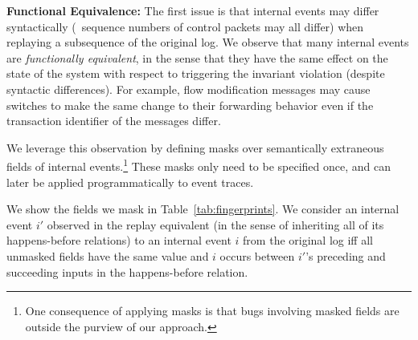 

{\bf Functional Equivalence: }The first issue is that internal events may differ syntactically (\eg~sequence numbers
of control packets may all differ) when replaying a subsequence of the original log.
We observe that many internal events are {\em functionally
equivalent}, in the sense that they
have the same effect on the state of the system with respect to triggering the
invariant violation (despite syntactic differences). For example, flow
modification messages may cause switches to make the same change to their forwarding behavior
even if the transaction identifier of the messages differ.

We leverage this observation by defining
masks over semantically extraneous fields of
internal events.\footnote{One consequence
of applying masks is that bugs involving masked fields are outside the purview of
our approach.} These masks only need to be specified once, and can later be
applied programmatically to event traces.

We show the fields we mask in Table~\ref{tab:fingerprints}. We consider an
internal event $i'$ observed in the replay
equivalent (in the sense of inheriting all of its happens-before relations) to an internal event $i$ from the original log iff all unmasked
fields have the same value
and $i$ occurs between $i'$'s preceding and succeeding inputs in the
happens-before relation.

